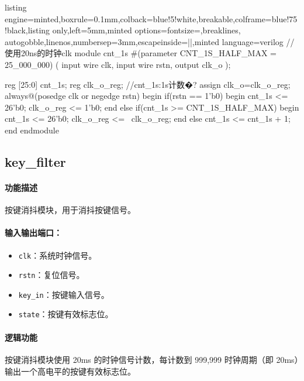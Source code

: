 \documentclass[a4paper]{article}
\begin{document}
\begin{tcblisting}{listing engine=minted,boxrule=0.1mm,colback=blue!5!white,breakable,colframe=blue!75!black,listing only,left=5mm,minted options={fontsize=\small,breaklines, autogobble,linenos,numbersep=3mm,escapeinside=||},minted language=verilog}
//使用20ns的时钟clk
module cnt_1s #(parameter CNT_1S_HALF_MAX = 25_000_000)
(
	input wire clk,
	input wire rstn,
	output clk_o
);

reg	[25:0] cnt_1s;
reg clk_o_reg;
//cnt_1s:1s计数�?
assign clk_o=clk_o_reg;
always@(posedge clk or negedge rstn) begin
	if(rstn == 1'b0) begin
		cnt_1s <= 26'b0;
        clk_o_reg <=	1'b0;
		end
	else if(cnt_1s >= CNT_1S_HALF_MAX) begin
		cnt_1s <= 26'b0;
        clk_o_reg <=	~clk_o_reg;
		end
	else
		cnt_1s <= cnt_1s + 1;
	end
endmodule
\end{tcblisting}

\subsection{key\_filter}

\paragraph{功能描述} 按键消抖模块，用于消抖按键信号。

\paragraph{输入输出端口：}
\begin{itemize}
    \item \texttt{clk}：系统时钟信号。
    \item \texttt{rstn}：复位信号。
    \item \texttt{key\_in}：按键输入信号。
    \item \texttt{state}：按键有效标志位。
\end{itemize}

\paragraph{逻辑功能}
按键消抖模块使用 20ms 的时钟信号计数，每计数到 999,999 时钟周期（即 20ms）输出一个高电平的按键有效标志位。
\end{document}
